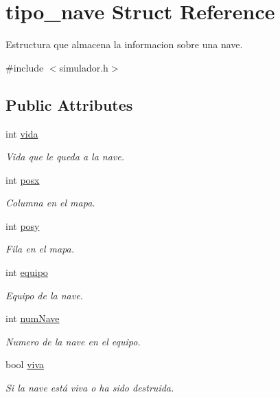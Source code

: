 \hypertarget{structtipo__nave}{}\section{tipo\+\_\+nave Struct Reference}
\label{structtipo__nave}


Estructura que almacena la informacion sobre una nave.  




{\ttfamily \#include $<$simulador.\+h$>$}

\subsection*{Public Attributes}
\begin{DoxyCompactItemize}
\item 
int \hyperlink{structtipo__nave_a319f01d0152cadf2b976ef51c93ff7ae}{vida}
\begin{DoxyCompactList}\small\item\em Vida que le queda a la nave. \end{DoxyCompactList}\item 
int \hyperlink{structtipo__nave_a51b86c3dbe20a9fe15170f3660991fa4}{posx}
\begin{DoxyCompactList}\small\item\em Columna en el mapa. \end{DoxyCompactList}\item 
int \hyperlink{structtipo__nave_aecc547543a942bf2ae99356141bb436a}{posy}
\begin{DoxyCompactList}\small\item\em Fila en el mapa. \end{DoxyCompactList}\item 
int \hyperlink{structtipo__nave_a9cef996f47c2096f5ee3752c26adde97}{equipo}
\begin{DoxyCompactList}\small\item\em Equipo de la nave. \end{DoxyCompactList}\item 
int \hyperlink{structtipo__nave_a0184bdd515add385641c157beee1064c}{num\+Nave}
\begin{DoxyCompactList}\small\item\em Numero de la nave en el equipo. \end{DoxyCompactList}\item 
bool \hyperlink{structtipo__nave_a5fd530b54ff7694b07d41d3a168b800c}{viva}
\begin{DoxyCompactList}\small\item\em Si la nave está viva o ha sido destruida. \end{DoxyCompactList}\end{DoxyCompactItemize}


